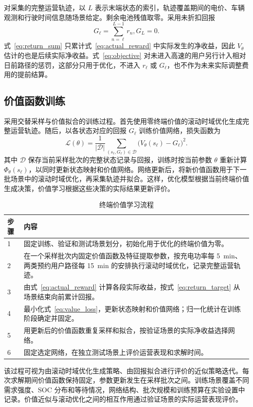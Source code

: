 对采集的完整运营轨迹，以 $L$ 表示末端状态的索引，轨迹覆盖期间的电价、车辆观测和行驶时间信息随场景给定。剩余电池残值取零。采用未折扣回报
\begin{subequations}\label{eq:return_target}
\begin{equation}
G_\ell=\sum_{n=\ell}^{L-1}r_n,
\label{eq:return_sum}
\end{equation}
\begin{equation}
G_L=0.
\label{eq:return_terminal}
\end{equation}
\end{subequations}
式~\eqref{eq:return_sum} 只累计式~\eqref{eq:actual_reward} 中实际发生的净收益，因此 $V_\theta$ 估计的也是后续实际净收益。式~\eqref{eq:objective} 对未进入高速的用户另行计入相对日前路径的惩罚，这部分只用于优化，不进入 $r_\ell$ 或 $G_\ell$，也不作为未来实际调整费用的提前结算。

\subsection{价值函数训练}
\label{sec:training}
采用交替采样与价值拟合的训练过程。首先使用零终端价值的滚动时域优化生成完整运营轨迹。随后，以各状态对应的回报 $G_\ell$ 训练价值网络，损失函数为
\begin{equation}
\mathcal L(\theta)=\frac{1}{|\mathcal D|}
\sum_{(s_\ell,G_\ell)\in\mathcal D}
\bigl(V_\theta(s_\ell)-G_\ell\bigr)^2.
\label{eq:value_loss}
\end{equation}
其中 $\mathcal D$ 保存当前采样批次的完整状态记录与回报，训练时按当前参数 $\theta$ 重新计算 $\Phi_\theta(s_\ell)$，以同时更新状态映射和价值网络。网络更新后，将新价值函数用于下一批场景中的滚动时域优化，再采集轨迹并拟合。这样，优化模型根据当前终端价值生成决策，价值学习根据这些决策的实际结果更新评价。

\begin{table}[!htbp]
\centering
\caption{终端价值学习流程}
\label{tab:training_algorithm}
\begin{tabularx}{\linewidth}{@{}lX@{}}
\toprule 步骤 & 内容 \\ \midrule
1 & 固定训练、验证和测试场景划分，初始化用于优化的终端价值为零。\\
2 & 在一个采样批次内固定价值函数及特征提取参数，按充电功率每 5~min、两类预约用户路径每 15~min 的安排执行滚动时域优化，记录完整运营轨迹。\\
3 & 由式~\eqref{eq:actual_reward} 计算各段实际收益，按式~\eqref{eq:return_target} 从场景结束向前累计回报。\\
4 & 最小化式~\eqref{eq:value_loss}，更新状态映射和价值网络；归一化统计在训练阶段确定并固定。\\
5 & 用更新后的价值函数重复采样和拟合，按验证场景的实际净收益选择网络。\\
6 & 固定选定网络，在独立测试场景上评价运营表现和求解时间。\\
\bottomrule
\end{tabularx}
\end{table}

该过程可视为由滚动时域优化生成策略、由回报拟合进行评价的近似策略迭代。每次求解期间价值函数保持固定，参数更新发生在采样批次之间。训练场景覆盖不同需求强度、SOC 分布和等待情况，网络结构、批次规模和训练预算在实验设置中记录。价值近似与滚动优化之间的相互作用通过验证场景的实际运营表现评价。

